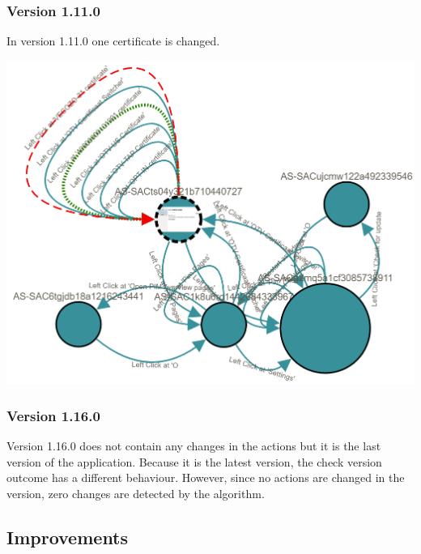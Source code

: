 \subsubsection{Version 1.11.0}

In version 1.11.0 one certificate is changed. 

\begingroup
\captionsetup{type=figure}
\includegraphics[scale=0.5]{images/6-Experiment/1_8_0-1_11_0.png}
\label{fig:1_8_0-1_11_0}
\endgroup
\subsubsection{Version 1.16.0}

Version 1.16.0 does not contain any changes in the actions but it is the last version of the application. Because it is the latest version, the check version outcome has a different behaviour. However, since no actions are changed in the version, zero changes are detected by the algorithm.

\subsection{Improvements}

